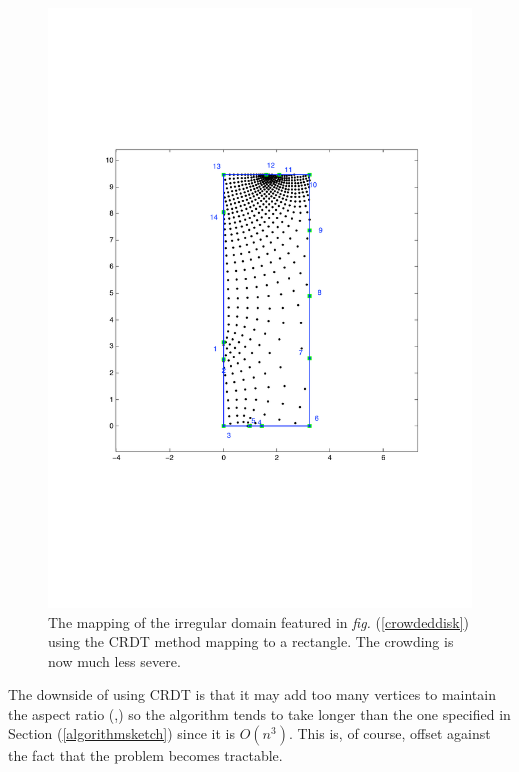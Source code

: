 \documentclass[a4paper,10pt]{amsart}
\newcommand{\fig}[1]{\emph{fig.} (\ref{#1})}
\begin{document}
\begin{figure} [tbp]
\centering
\includegraphics[scale=0.5]{figs/irregular-fixed-crdt.pdf}
\caption{The mapping of the irregular domain featured in \fig{crowdeddisk} using the CRDT method mapping to a rectangle. The crowding is now much less severe.}
\label{uncrowdeddisk}
\end{figure}

The downside of using CRDT is that it may add too many vertices to maintain the aspect ratio (\cite{driscoll05},) so the algorithm tends to take longer than the one specified in Section (\ref{algorithmsketch}) since it is $O(n^3)$. This is, of course, offset against the fact that the problem becomes tractable.



\end{document}
